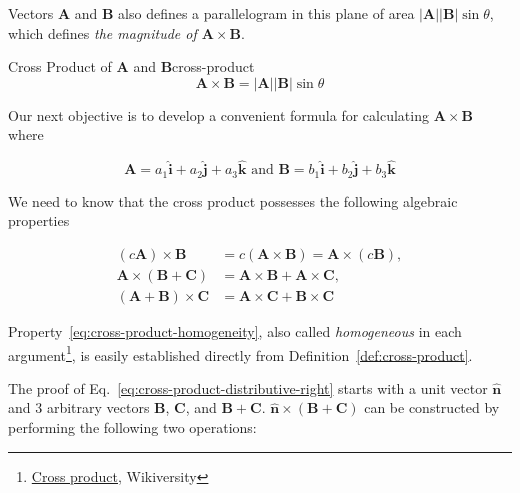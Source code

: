Vectors $\boldsymbol{A}$ and $\boldsymbol{B}$ also defines a parallelogram in this plane of area
$\vert \boldsymbol{A} \vert\vert \boldsymbol{B} \vert\sin{\theta}$, which defines \textit{the magnitude of
$\boldsymbol{A} \times \boldsymbol{B}$}.

\begin{Definition}{Cross Product of $\boldsymbol{A}$ and $\boldsymbol{B}$}{cross-product}
    \begin{equation}
        \boldsymbol{A} \times \boldsymbol{B} = \vert \boldsymbol{A} \vert\vert \boldsymbol{B} \vert\sin{\theta}
    \end{equation}
\end{Definition}

Our next objective is to develop a convenient formula for calculating $\boldsymbol{A} \times \boldsymbol{B}$ where

\begin{equation}\label{eq:cross-product-of-two}
    \boldsymbol{A} = a_1\boldsymbol{\hat{i}} + a_2\boldsymbol{\hat{j}} + a_3\boldsymbol{\hat{k}} \text{\ \ \ \ \ \ and \ \ \ \ \ \ }
    \boldsymbol{B} = b_1\boldsymbol{\hat{i}} + b_2\boldsymbol{\hat{j}} + b_3\boldsymbol{\hat{k}}
\end{equation}

We need to know that the cross product possesses the following algebraic properties

\begin{align}
    (c\boldsymbol{A}) \times \boldsymbol{B} &= c(\boldsymbol{A} \times \boldsymbol{B}) = \boldsymbol{A} \times (c\boldsymbol{B})\label{eq:cross-product-homogeneity}, \\
    \boldsymbol{A} \times (\boldsymbol{B} + \boldsymbol{C}) &= \boldsymbol{A} \times \boldsymbol{B} + \boldsymbol{A} \times \boldsymbol{C}\label{eq:cross-product-distributive-right}, \\
    (\boldsymbol{A} + \boldsymbol{B}) \times \boldsymbol{C} &= \boldsymbol{A} \times \boldsymbol{C} + \boldsymbol{B} \times \boldsymbol{C}\label{eq:cross-product-distributive-left}
\end{align}

Property~\ref{eq:cross-product-homogeneity}, also called \textit{homogeneous} in each
argument\footnote{\href{https://en.wikiversity.org/wiki/Cross_product}{Cross product}, Wikiversity}, is easily
established directly from Definition~\ref{def:cross-product}.

The proof of Eq.~\ref{eq:cross-product-distributive-right} starts with a unit vector $\boldsymbol{\hat{n}}$ and 3
arbitrary vectors $\boldsymbol{B}$, $\boldsymbol{C}$, and $\boldsymbol{B + C}$.
$\boldsymbol{\hat{n}} \times \boldsymbol{(B + C)}$ can be constructed by performing the following two operations:

